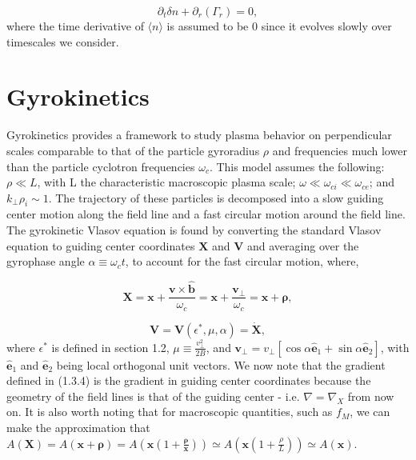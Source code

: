 \documentclass[12pt]{article}
\numberwithin{equation}{subsection}
\begin{document}
   \begin{equation}
      \partial_t\delta n + \partial_r(\Gamma_r) = 0,
   \end{equation}
where the time derivative of $\langle n\rangle$ is assumed to be $0$ since it evolves slowly over timescales we
consider.


\section{Gyrokinetics}
   \quad Gyrokinetics provides a framework to study plasma behavior on perpendicular scales comparable to that of the
particle gyroradius $\rho$ and frequencies much lower than the particle cyclotron frequencies $\omega_c$. This model assumes
the following: $\rho \ll L$, with L the characteristic macroscopic plasma scale; $\omega \ll \omega_{ci} \ll \omega_{ce}$;
and $k_\perp \rho_i \sim 1$\cite{GyroKinAstr}. The trajectory of these particles is decomposed into a slow guiding center motion
along the field line and a fast circular motion around the field line. The gyrokinetic Vlasov equation is found by converting the
standard Vlasov equation to guiding center coordinates $\bm{X}$ and $\bm{V}$ and averaging over the gyrophase angle $\alpha
\equiv \omega_c t$, to account for the fast circular motion, where\cite{FriemanChen},

   \begin{equation}
      \bm{X} = \bm{x} + \frac{\bm{v}\times\bm{\hat{b}}}{\omega_c} = \bm{x} + \frac{\bm{v}_\perp}{\omega_c}
             = \bm{x} + \bm{\rho},
   \end{equation}

   \begin{equation}
      \bm{V} = \bm{V}(\epsilon^*, \mu, \alpha) = \dot{\bm{X}},
   \end{equation}
where $\epsilon^*$ is defined in section 1.2, $\mu \equiv \frac{v_\perp^2}{2B}$, and $\bm{v}_\perp =
v_\perp[\cos\alpha\bm{\hat{e}}_1 + \sin\alpha\bm{\hat{e}}_2]$\cite{FriemanChen}, with $\bm{\hat{e}}_1$
and $\bm{\hat{e}}_2$ being local orthogonal unit vectors. We now note that the gradient defined
in (1.3.4) is the gradient in guiding center coordinates because the geometry of the field lines
is that of the guiding center - i.e. $\nabla = \nabla_X$ from now on. It is also worth noting that for
macroscopic quantities, such as $f_M$, we can make the approximation that $A(\bm{X}) = A(\bm{x} + \bm{\rho} )
= A(\bm{x}(1 + \frac{\bm{\rho}}{\bm{x}})) \simeq A(\bm{x}(1 + \frac{\rho}{L})) \simeq A(\bm{x})$.
\end{document}
